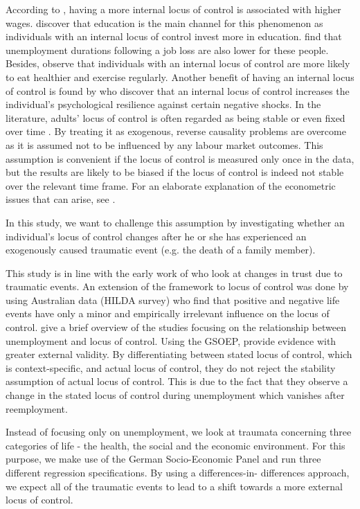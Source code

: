 \documentclass[12pt, a4paper, fleqn, parskip]{scrartcl}
\begin{document}
According to \citet{heineck2010}, having a more internal locus of control is
associated with higher wages. \citet{piatek2010} discover that education is the
main channel for this phenomenon as individuals with an internal locus of
control invest more in education. \citet{gallo2003} find that unemployment
durations following a job loss are also lower for these people. Besides,
\citet{cobb2014} observe that individuals with an internal locus of control are
more likely to eat healthier and exercise regularly. Another benefit of having
an internal locus of control is found by \citet{buddelmeyer2016} who discover
that an internal locus of control increases the individual's psychological
resilience against certain negative shocks. In the literature, adults' locus of
control is often regarded as being stable or even fixed over time
\citep{heineck2010,semykina2007}. By treating it as exogenous, reverse
causality problems are overcome as it is assumed not to be influenced by any
labour market outcomes. This assumption is convenient if the locus of control
is measured only once in the data, but the results are likely to be biased if
the locus of control is indeed not stable over the relevant time frame. For an
elaborate explanation of the econometric issues that can arise, see
\citet{cobb2013}.

In this study, we want to challenge this assumption by investigating whether an
individual's locus of control changes after he or she has experienced an
exogenously caused traumatic event (e.g. the death of a family member).

This study is in line with the early work of \citet{alesina2002} who look at
changes in trust due to traumatic events. An extension of the framework to
locus of control was done by \citet{cobb2013} using Australian data
(HILDA survey) who find that positive and negative life events have only a
minor and empirically irrelevant  influence on the locus of control.
\citet{preuss2017} give a brief overview of the studies focusing on the
relationship between unemployment and locus of control. Using the GSOEP,
\citet{preuss2017} provide evidence with greater external validity. By
differentiating between stated locus of control, which is context-specific, and
actual locus of control, they do not reject the stability assumption of actual
locus of control. This is due to the fact that they observe a change in the
stated locus of control during unemployment which vanishes after reemployment.

Instead of focusing only on unemployment, we look at traumata concerning three
categories of life - the health, the social and the economic environment.  For
this purpose, we make use of the German Socio-Economic Panel \citep{gsoep2017}
and run three different regression specifications. By using a differences-in-
differences approach, we expect all of the traumatic events to lead to a shift
towards a more external locus of control.
\end{document}
